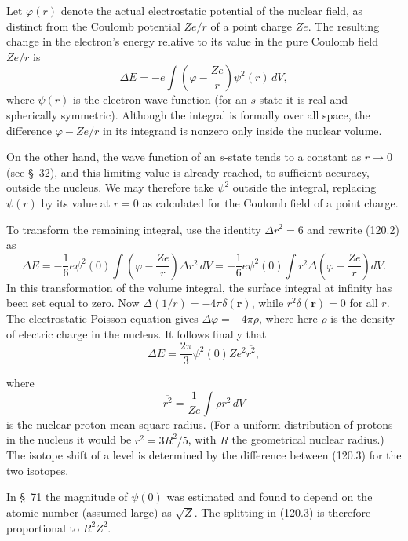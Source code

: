 Let $\varphi(r)$ denote the actual electrostatic potential of the nuclear
field, as distinct from the Coulomb potential $Ze/r$ of a point charge $Ze$.
The resulting change in the electron's energy relative to its value in the
pure Coulomb field $Ze/r$ is
\begin{equation}
 \Delta E=-e\int\left(\varphi-\frac{Ze}{r}\right)\psi^2(r)\,dV,
 \tag{120.2}
\end{equation}
where $\psi(r)$ is the electron wave function (for an $s$-state it is real and
spherically symmetric). Although the integral is formally over all space, the
difference $\varphi-Ze/r$ in its integrand is nonzero only inside the nuclear
volume.

On the other hand, the wave function of an $s$-state tends to a constant as
$r\to0$ (see \S~32), and this limiting value is already reached, to sufficient
accuracy, outside the nucleus. We may therefore take $\psi^2$ outside the
integral, replacing $\psi(r)$ by its value at $r=0$ as calculated for the
Coulomb field of a point charge.

To transform the remaining integral, use the identity $\Delta r^2=6$ and
rewrite (120.2) as
\[
 \Delta E=-\frac16e\psi^2(0)\int
 \left(\varphi-\frac{Ze}{r}\right)\Delta r^2\,dV
 =-\frac16e\psi^2(0)\int r^2\Delta
 \left(\varphi-\frac{Ze}{r}\right)dV.
\]
In this transformation of the volume integral, the surface integral at
infinity has been set equal to zero. Now
$\Delta(1/r)=-4\pi\delta(\mathbf r)$, while
$r^2\delta(\mathbf r)=0$ for all $r$. The electrostatic Poisson equation gives
$\Delta\varphi=-4\pi\rho$, where here $\rho$ is the density of electric charge
in the nucleus. It follows finally that
\begin{equation}
 \Delta E=\frac{2\pi}{3}\psi^2(0)Ze^2\overline{r^2},
 \tag{120.3}
\end{equation}

where
\[
 \overline{r^2}=\frac1{Ze}\int\rho r^2\,dV
\]
is the nuclear proton mean-square radius. (For a uniform distribution of
protons in the nucleus it would be $\overline{r^2}=3R^2/5$, with $R$ the
geometrical nuclear radius.) The isotope shift of a level is determined by the
difference between (120.3) for the two isotopes.

In \S~71 the magnitude of $\psi(0)$ was estimated and found to depend on the
atomic number (assumed large) as $\sqrt Z$. The splitting in (120.3) is
therefore proportional to $R^2Z^2$.

